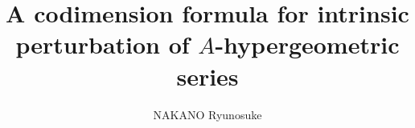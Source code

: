 \documentclass[10pt]{amsart}
\title[A codimension formula for intrinsic perturbation]{A codimension formula
for intrinsic perturbation of \(A\)-hypergeometric series}
\author{NAKANO Ryunosuke}
\date{}
\theoremstyle{definition}
\theoremstyle{remark}
\begin{document}
\begin{abstract}
	
\end{abstract}

\maketitle


\end{document}
